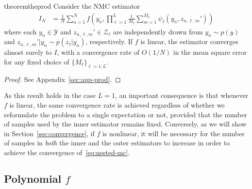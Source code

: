 \begin{restatable}{theorem}{theprod}
	\label{the:prod}
	Consider the NMC estimator
	\begin{align*}
	I_{N} &= \frac{1}{N}\sum_{n=1}^N f\left(y_n,\prod_{\ell=1}^{L} \frac{1}{M_{\ell}} \sum_{m=1}^{M_{\ell}} \psi_{\ell}(y_n,z_{n,\ell,m}')\right)
	\end{align*}
	where each $y_n \in \mathcal{Y}$ and $z_{n,\ell,m}' \in \mathcal{Z}_{\ell}$ are independently drawn from 
	$y_n \sim p(y)$ and $z_{n,\ell,m}' | y_n \sim p(z_{\ell} | y_n)$, respectively. If $f$ is linear, 
        the estimator converges almost surely to $I$,
	with a convergence rate of $O(1/N)$ in the mean square error for any fixed choice of $\{M_{\ell}\}_{\ell = 1:L}$.
\end{restatable}
\begin{proof}
See Appendix~\ref{sec:app-prod}.
\end{proof}

As this result holds in the case $L=1$, an important consequence is that
whenever $f$ is linear, the same convergence rate is achieved regardless of whether we
reformulate the problem to a single expectation or not, provided that the number of samples
used by the inner estimator remains fixed.  Conversely, as we will show in Section~\ref{sec:convergence},
if $f$ is nonlinear, it will be necessary for the number of samples in \emph{both} the inner and the 
outer estimators to increase in order to achieve the convergence of~\eqref{eq:nested-mc}. 

\subsection{Polynomial $f$}
\label{sec:polynomial}

